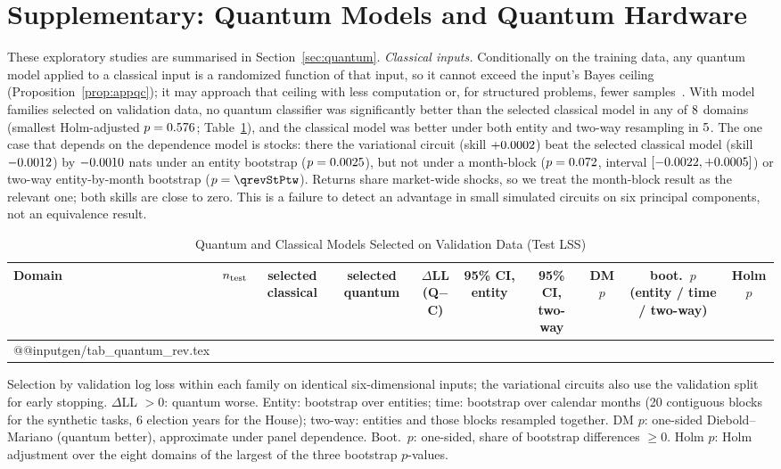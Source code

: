 \documentclass[journal]{IEEEtran}
\theoremstyle{definition}
\begin{document}
\appendices



\section{Supplementary: Quantum Models and Quantum Hardware}\label{app:supp}
These exploratory studies are summarised in Section~\ref{sec:quantum}.
\emph{Classical inputs.} Conditionally on the training data, any quantum model applied to a classical input is a randomized function of that input, so it cannot exceed the input's Bayes ceiling (Proposition~\ref{prop:appqc}); it may approach that ceiling with less computation or, for structured problems, fewer samples~\cite{liu2021rigorous,huang2021information}. With model families selected on validation data, no quantum classifier was significantly better than the selected classical model in any of $8$ domains (smallest Holm-adjusted $p=0.576$; Table~\ref{tab:quantum}), and the classical model was better under both entity and two-way resampling in $5$. The one case that depends on the dependence model is stocks: there the variational circuit (skill $+0.0002$) beat the selected classical model (skill $-0.0012$) by $-0.0010$ nats under an entity bootstrap ($p=0.0025$), but not under a month-block ($p=0.072$, interval $[-0.0022,+0.0005]$) or two-way entity-by-month bootstrap ($p=\qrevStPtw$). Returns share market-wide shocks, so we treat the month-block result as the relevant one; both skills are close to zero. This is a failure to detect an advantage in small simulated circuits on six principal components, not an equivalence result.

\begin{table}[!t]
\caption{Quantum and Classical Models Selected on Validation Data (Test LSS)}
\label{tab:quantum}
\centering
\scriptsize
\setlength{\tabcolsep}{2.3pt}
\begin{tabular}{@{}lrcccccccc@{}}
\toprule
Domain & $n_{\rm test}$ & selected classical & selected quantum & $\Delta$LL (Q$-$C) & 95\% CI, entity & 95\% CI, two-way & DM $p$ & boot.\ $p$ (entity / time / two-way) & Holm $p$\\
\midrule
\csname @@input\endcsname gen/tab_quantum_rev.tex
\bottomrule
\end{tabular}
\vspace{2pt}

\parbox{\textwidth}{\footnotesize Selection by validation log loss within each family on identical six-dimensional inputs; the variational circuits also use the validation split for early stopping. $\Delta$LL $>0$: quantum worse. Entity: bootstrap over entities; time: bootstrap over calendar months (20 contiguous blocks for the synthetic tasks, 6 election years for the House); two-way: entities and those blocks resampled together. DM $p$: one-sided Diebold--Mariano (quantum better), approximate under panel dependence. Boot.\ $p$: one-sided, share of bootstrap differences $\ge0$. Holm $p$: Holm adjustment over the eight domains of the largest of the three bootstrap $p$-values.}
\end{table}
\end{document}
